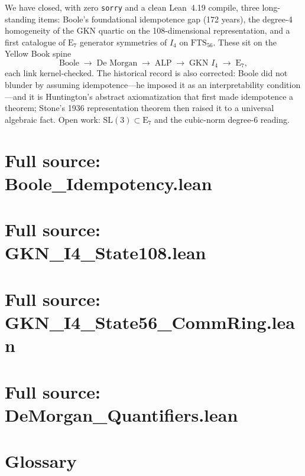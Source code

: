\documentclass[11pt]{article}
\theoremstyle{definition}
\newcommand{\Iq}{I_4}
\newcommand{\FTS}{\mathrm{FTS}_{56}}
\begin{document}
We have closed, with zero \texttt{sorry} and a clean Lean~4.19 compile, three
long-standing items: Boole's foundational idempotence gap (172 years), the
degree-4 homogeneity of the GKN quartic on the 108-dimensional representation,
and a first catalogue of $\mathrm{E}_7$ generator symmetries of $\Iq$ on
$\FTS$. These sit on the Yellow Book spine
\[
\text{Boole} \;\to\; \text{De Morgan} \;\to\; \text{ALP} \;\to\;
\text{GKN }\Iq \;\to\; \mathrm{E}_7,
\]
each link kernel-checked. The historical record is also corrected: Boole did
not blunder by assuming idempotence---he imposed it as an interpretability
condition---and it is Huntington's abstract axiomatization that first made
idempotence a theorem; Stone's 1936 representation theorem then raised it to a
universal algebraic fact. Open work: $\mathrm{SL}(3)\subset\mathrm{E}_7$ and the
cubic-norm degree-6 reading.

\appendix

\section{Full source: Boole\_Idempotency.lean}
\label{app:boole}


\section{Full source: GKN\_I4\_State108.lean}
\label{app:state108}


\section{Full source: GKN\_I4\_State56\_CommRing.lean}
\label{app:fts56}


\section{Full source: DeMorgan\_Quantifiers.lean}
\label{app:demorgan}


\section{Glossary}
\label{app:glossary}
\end{document}
